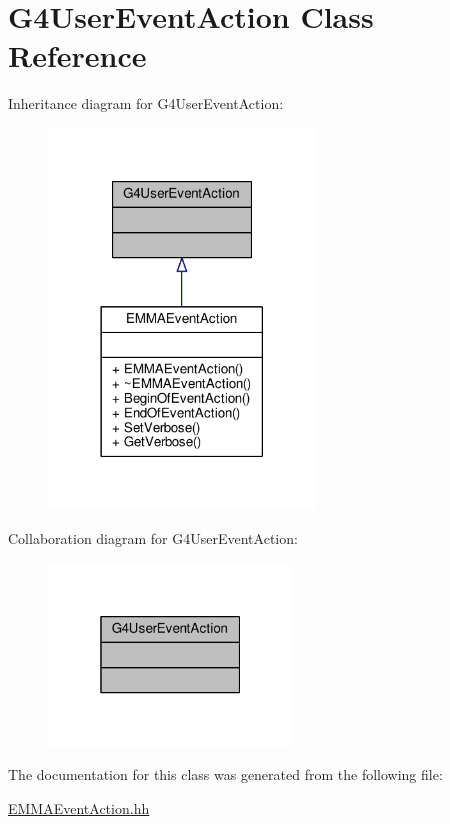 \hypertarget{classG4UserEventAction}{}\section{G4\+User\+Event\+Action Class Reference}
\label{classG4UserEventAction}


Inheritance diagram for G4\+User\+Event\+Action\+:
\nopagebreak
\begin{figure}[H]
\begin{center}
\leavevmode
\includegraphics[width=201pt]{classG4UserEventAction__inherit__graph}
\end{center}
\end{figure}


Collaboration diagram for G4\+User\+Event\+Action\+:
\nopagebreak
\begin{figure}[H]
\begin{center}
\leavevmode
\includegraphics[width=184pt]{classG4UserEventAction__coll__graph}
\end{center}
\end{figure}


The documentation for this class was generated from the following file\+:\begin{DoxyCompactItemize}
\item 
\hyperlink{EMMAEventAction_8hh}{E\+M\+M\+A\+Event\+Action.\+hh}\end{DoxyCompactItemize}
